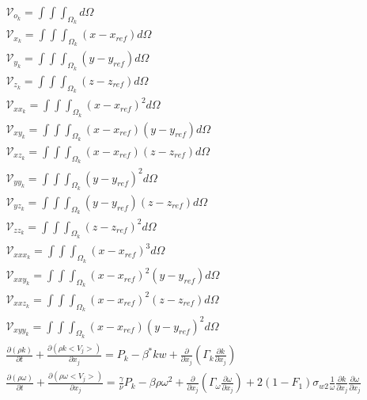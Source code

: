\begin{equation}\label{eq:eqns}
\begin{gathered}
\nonumber
\mathcal{V}_{o_k}=\int\int\int_{\Omega_k}d\Omega \\
\mathcal{V}_{x_k}=\int\int\int_{\Omega_k}(x-x_{ref})d\Omega\\ 
\mathcal{V}_{y_k}=\int\int\int_{\Omega_k}(y-y_{ref})d\Omega\\ 
\mathcal{V}_{z_k}=\int\int\int_{\Omega_k}(z-z_{ref})d\Omega\\ 
\mathcal{V}_{xx_k}=\int\int\int_{\Omega_k}(x-x_{ref})^2d\Omega\\ 
\mathcal{V}_{xy_k}=\int\int\int_{\Omega_k}(x-x_{ref})(y-y_{ref})d\Omega\\ 
\mathcal{V}_{xz_k}=\int\int\int_{\Omega_k}(x-x_{ref})(z-z_{ref})d\Omega\\ 
\mathcal{V}_{yy_k}=\int\int\int_{\Omega_k}(y-y_{ref})^2d\Omega\\ 
\mathcal{V}_{yz_k}=\int\int\int_{\Omega_k}(y-y_{ref})(z-z_{ref})d\Omega\\ 
\mathcal{V}_{zz_k}=\int\int\int_{\Omega_k}(z-z_{ref})^2d\Omega\\ 
\mathcal{V}_{xxx_k}=\int\int\int_{\Omega_k}(x-x_{ref})^3d\Omega\\ 
\mathcal{V}_{xxy_k}=\int\int\int_{\Omega_k}(x-x_{ref})^2(y-y_{ref})d\Omega\\ 
\mathcal{V}_{xxz_k}=\int\int\int_{\Omega_k}(x-x_{ref})^2(z-z_{ref})d\Omega\\ 
\mathcal{V}_{xyy_k}=\int\int\int_{\Omega_k}(x-x_{ref})(y-y_{ref})^2d\Omega\\ 
\frac{\partial (\rho k)}{\partial t}+\frac{\partial (\rho k <V_j>)}{\partial x_j}=P_k-\beta^*k w+\frac{\partial}{\partial x_j}(\Gamma_{k}\frac{\partial k}{\partial x_j})\\
\frac{\partial (\rho \omega)}{\partial t}+\frac{\partial (\rho \omega <V_j>)}{\partial x_j}=\frac{\gamma}{\nu}P_k-\beta\rho\omega^2+\frac{\partial}{\partial x_j}(\Gamma_{\omega}\frac{\partial \omega}{\partial x_j})+2(1-F_1)\sigma_{w2}\frac{1}{\omega}\frac{\partial k}{\partial x_j}\frac{\partial \omega}{\partial x_j}
\end{gathered}
\end{equation}\\
